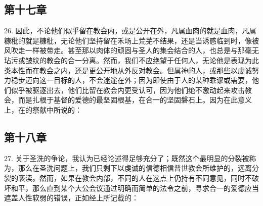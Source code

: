 
\subsection{第十七章}

26. 因此，不论他们似乎留在教会内，或是公开在外，凡属血肉的就是血肉，凡属糠秕的就是糠秕，无论他们坚持留在禾场上荒芜不结果，还是当诱惑临到时，像被风吹走一样被带走。甚至那以肉体的顽固与圣人的集会结合的人，也总是与那毫无玷污或皱纹的教会的合一分离。然而，我们不应绝望于任何人，无论他是表现为此类本性而在教会之内，还是更公开地从外反对教会。但属神的人，或那些以虔诚努力稳步迈向这一目标的人，不会迷途在外；因为即使由于人的某种乖谬或需要，他们似乎被驱逐出去，他们比留在教会内更受认可，因为他们绝不激动起来攻击教会，而是扎根于基督的爱德的最坚固根基，在合一的坚固磐石上。因为在此意义上，在的祭献中所说的：\par


\subsection{第十八章}

27. 关于圣洗的争论，我认为已经论述得足够充分了；既然这个最明显的分裂被称为，那么在圣洗问题上，我们只剩下以虔诚的信德相信普世教会所维护的，远离分裂的亵渎。然而，如果在教会内部，不同的人在这点上仍持有不同意见，同时不破坏和平，那么直到某个大公会议通过明确而简单的法令之前，寻求合一的爱德应当遮盖人性软弱的错误，正如经上所记载的：\par

